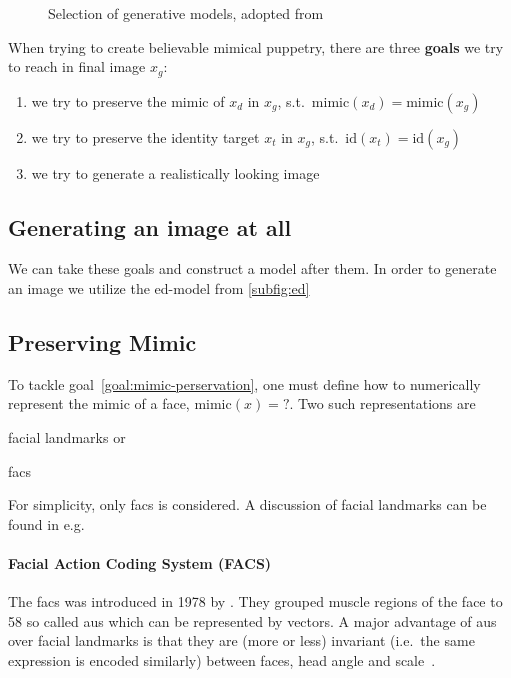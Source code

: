 \begin{figure}[h]
    \centering
    \caption{Selection of generative models, adopted from~\cite{Mirsky.2020}}\label{fig:generative-models}
\end{figure}

When trying to create believable mimical puppetry, there are three \textbf{goals}
we try to reach in final image \(x_g\):
\begin{enumerate}[1.)]
    \item we try to preserve the mimic of \(x_d\) in \(x_g\), s.t.\ \(\text{mimic}(x_d)=\text{mimic}(x_g)\)\label{goal:mimic-perservation}
    \item we try to preserve the identity target \(x_t\) in \(x_g\), s.t.\ \(\text{id}(x_t)=\text{id}(x_g)\)\label{goal:preserve-identity}
    \item we try to generate a realistically looking image\label{goal:increase-realism}
\end{enumerate}
\subsection{Generating an image at all}
We can take these goals and construct a model after them. In order to generate
an image we utilize the \gls{ed}-model from \cref{subfig:ed}

\subsection{Preserving Mimic}
To tackle goal~\ref{goal:mimic-perservation}, one must define how to
numerically represent the mimic of a face, \(\text{mimic}(x)=\mathord{?}\).
Two such representations are
\begin{enumerate*}[a.)]
    \item facial landmarks or
    \item \gls{facs}
\end{enumerate*}
For simplicity, only \gls{facs} is considered. A discussion of facial landmarks
can be found in e.g.\ \cite{Ha.2020}

\paragraph*{Facial Action Coding System (FACS)}
The \gls{facs} was introduced in 1978 by \textcite{Ekman.1978}. They grouped
muscle regions of the face to 58 so called \glspl{au} which can be represented
by vectors. A major advantage of \glspl{au} over facial landmarks is that they
are (more or less) invariant (i.e.\ the same expression is encoded similarly)
between faces, head angle and scale~\cite{Pham.2018}.

